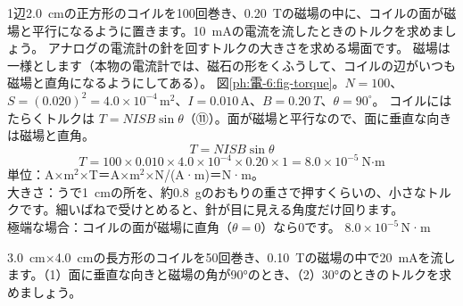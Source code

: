\label{ph:電-6:ex11}
\begin{phreidai}[電流計のコイルにはたらくトルク]
1辺\qty{2.0}{cm}の正方形のコイルを100回巻き、\qty{0.20}{T}の磁場の中に、コイルの面が磁場と平行になるように置きます。\qty{10}{mA}の電流を流したときのトルクを求めましょう。
\phbamen
アナログの電流計の針を回すトルクの大きさを求める場面です。
\phmushi
磁場は一様とします（本物の電流計では、磁石の形をくふうして、コイルの辺がいつも磁場と直角になるようにしてある）。
\phzu
図\ref{ph:電-6:fig-torque}。$N=100$、$S=(0.020)^2=4.0\times10^{-4}$\,m$^2$、$I=0.010$\,A、$B=\qty{0.20}{T}$、$\theta=90^\circ$。
\phriyu
コイルにはたらくトルクは $T=NISB\sin\theta$（⑪）。面が磁場と平行なので、面に垂直な向きは磁場と直角。
\phtateru
\[T=NISB\sin\theta\]
\phtoku
\[T=100\times0.010\times4.0\times10^{-4}\times0.20\times1=8.0\times10^{-5}\ \text{N·m}\]
\phtashikame
単位：A×m$^2$×T＝A×m$^2$×N/(A·m)＝N·m。\\
大きさ：うで\qty{1}{cm}の所を、約\qty{0.8}{g}のおもりの重さで押すくらいの、小さなトルクです。細いばねで受けとめると、針が目に見える角度だけ回ります。\\
極端な場合：コイルの面が磁場に直角（$\theta=0$）なら0です。
\kotae $8.0\times10^{-5}$\,N·m
\end{phreidai}
\begin{jibun}
\qty{3.0}{cm}×\qty{4.0}{cm}の長方形のコイルを50回巻き、\qty{0.10}{T}の磁場の中で\qty{20}{mA}を流します。（1）面に垂直な向きと磁場の角が90°のとき、（2）30°のときのトルクを求めましょう。
\end{jibun}

